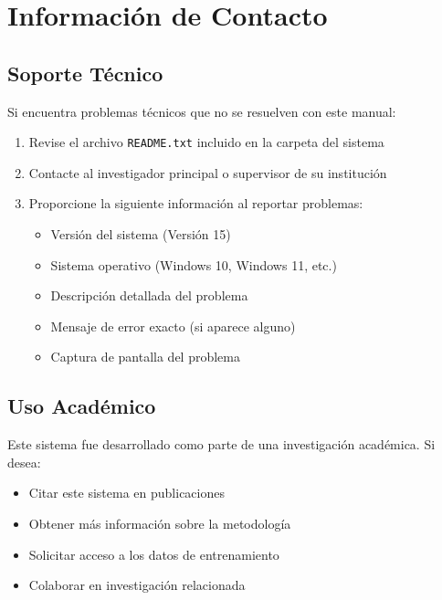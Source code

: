 \documentclass[12pt,a4paper]{article}
\begin{document}
\newpage

\section{Información de Contacto}

\subsection{Soporte Técnico}

Si encuentra problemas técnicos que no se resuelven con este manual:

\begin{enumerate}[leftmargin=*]
    \item Revise el archivo \texttt{README.txt} incluido en la carpeta del sistema
    \item Contacte al investigador principal o supervisor de su institución
    \item Proporcione la siguiente información al reportar problemas:
    \begin{itemize}
        \item Versión del sistema (Versión 15)
        \item Sistema operativo (Windows 10, Windows 11, etc.)
        \item Descripción detallada del problema
        \item Mensaje de error exacto (si aparece alguno)
        \item Captura de pantalla del problema
    \end{itemize}
\end{enumerate}

\subsection{Uso Académico}

Este sistema fue desarrollado como parte de una investigación académica. Si desea:
\begin{itemize}[leftmargin=*]
    \item Citar este sistema en publicaciones
    \item Obtener más información sobre la metodología
    \item Solicitar acceso a los datos de entrenamiento
    \item Colaborar en investigación relacionada
\end{itemize}
\end{document}
